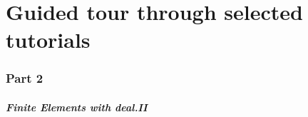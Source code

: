 \part{Guided tour through selected tutorials}

\section*{Part 2}
\begin{frame}
  \frametitle{Finite Elements with deal.II}
  \tableofcontents[hideallsubsections]

  \vfill

  \hyperlink{part1}{}
  \hypertarget{part2}{}
  \hyperlink{part3}{}
\end{frame}

%

%





%
%


